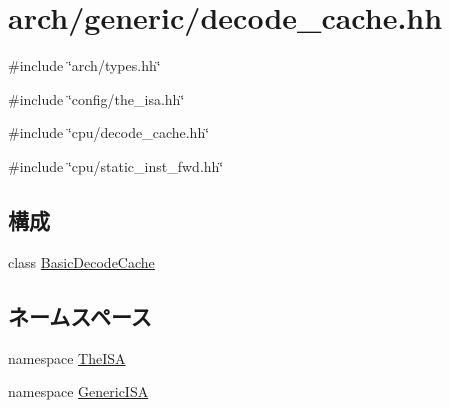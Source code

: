 \hypertarget{arch_2generic_2decode__cache_8hh}{
\section{arch/generic/decode\_\-cache.hh}
\label{arch_2generic_2decode__cache_8hh}
}
{\ttfamily \#include \char`\"{}arch/types.hh\char`\"{}}\par
{\ttfamily \#include \char`\"{}config/the\_\-isa.hh\char`\"{}}\par
{\ttfamily \#include \char`\"{}cpu/decode\_\-cache.hh\char`\"{}}\par
{\ttfamily \#include \char`\"{}cpu/static\_\-inst\_\-fwd.hh\char`\"{}}\par
\subsection*{構成}
\begin{DoxyCompactItemize}
\item 
class \hyperlink{classGenericISA_1_1BasicDecodeCache}{BasicDecodeCache}
\end{DoxyCompactItemize}
\subsection*{ネームスペース}
\begin{DoxyCompactItemize}
\item 
namespace \hyperlink{namespaceTheISA}{TheISA}
\item 
namespace \hyperlink{namespaceGenericISA}{GenericISA}
\end{DoxyCompactItemize}

